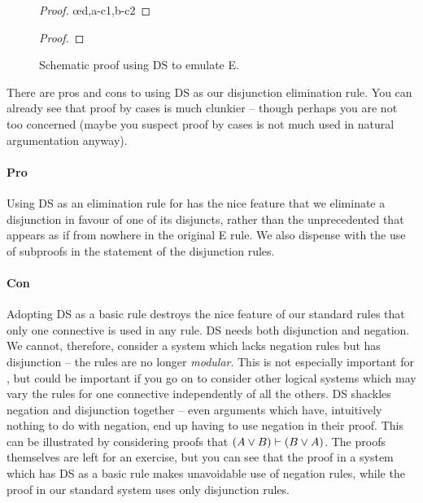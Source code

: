 \begin{figure}
\begin{minipage}{0.45\textwidth}
	\begin{proof}
	\have[\ ]{}{\vdots}
	\open
	\close
	\open
	\close
	\oe{d,a-c1,b-c2}
\end{proof}
\caption{Schematic {\eor}E proof.\label{DSa}}
\end{minipage} \qquad\begin{minipage}{0.45\textwidth}
		\begin{proof}
	\open
	\have[\ ]{}{\vdots}
	\open
	\have[\ ]{}{\vdots}
	\close
	\have[\ ]{}{\vdots}
	\close
\end{proof}
		\caption{Schematic proof using DS to emulate {\eor}E.\label{DSb}}
\end{minipage}
	\end{figure}

There are pros and cons to using DS as our disjunction elimination rule. You can already see that proof by cases is much clunkier – though perhaps you are not too concerned (maybe you suspect proof by cases is not much used in natural argumentation anyway). 
\paragraph{Pro} Using DS as an elimination rule for {\eor} has the nice feature that we eliminate a disjunction in favour of one of its disjuncts, rather than the unprecedented  that appears as if from nowhere in the original {\eor}E rule. We also dispense with the use of subproofs in the statement of the disjunction rules.
\paragraph{Con} Adopting DS as a basic rule destroys the nice feature of our standard rules that only one connective is used in any rule. DS needs both disjunction and negation. We cannot, therefore, consider a system which lacks negation rules but has disjunction – the rules are no longer \emph{modular}. This is not especially important for \TFL, but could be important if you go on to consider other logical systems which may vary the rules for one connective independently of all the others. DS shackles negation and disjunction together – even arguments which have, intuitively nothing to do with negation, end up having to use negation in their proof. This can be illustrated by considering proofs that $(A\vee B)\vdash (B \vee A)$. The proofs themselves are left for an exercise, but you can see that the proof in a system which has DS as a basic rule makes unavoidable use of negation rules, while the proof in our standard system uses only disjunction rules.

